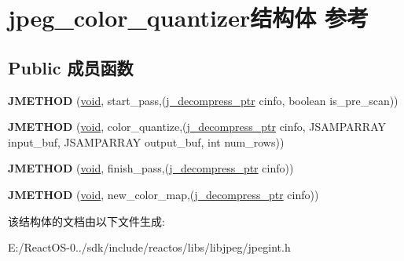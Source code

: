 \hypertarget{structjpeg__color__quantizer}{}\section{jpeg\+\_\+color\+\_\+quantizer结构体 参考}
\label{structjpeg__color__quantizer}
\subsection*{Public 成员函数}
\begin{DoxyCompactItemize}
\item 
\mbox{\label{structjpeg__color__quantizer_a3296d9d04a267c50808154ce6bdcef1b}} 
{\bfseries J\+M\+E\+T\+H\+OD} (\hyperlink{interfacevoid}{void}, start\+\_\+pass,(\hyperlink{structjpeg__decompress__struct}{j\+\_\+decompress\+\_\+ptr} cinfo, boolean is\+\_\+pre\+\_\+scan))
\item 
\mbox{\label{structjpeg__color__quantizer_ac11184c8e0fdc9c0ec200c0fab197b5f}} 
{\bfseries J\+M\+E\+T\+H\+OD} (\hyperlink{interfacevoid}{void}, color\+\_\+quantize,(\hyperlink{structjpeg__decompress__struct}{j\+\_\+decompress\+\_\+ptr} cinfo, J\+S\+A\+M\+P\+A\+R\+R\+AY input\+\_\+buf, J\+S\+A\+M\+P\+A\+R\+R\+AY output\+\_\+buf, int num\+\_\+rows))
\item 
\mbox{\label{structjpeg__color__quantizer_abb5268c27447bc9ae1876c5fffa94081}} 
{\bfseries J\+M\+E\+T\+H\+OD} (\hyperlink{interfacevoid}{void}, finish\+\_\+pass,(\hyperlink{structjpeg__decompress__struct}{j\+\_\+decompress\+\_\+ptr} cinfo))
\item 
\mbox{\label{structjpeg__color__quantizer_a9531395d8c6f914f57bea01ff2b2c5b4}} 
{\bfseries J\+M\+E\+T\+H\+OD} (\hyperlink{interfacevoid}{void}, new\+\_\+color\+\_\+map,(\hyperlink{structjpeg__decompress__struct}{j\+\_\+decompress\+\_\+ptr} cinfo))
\end{DoxyCompactItemize}


该结构体的文档由以下文件生成\+:\begin{DoxyCompactItemize}
\item 
E\+:/\+React\+O\+S-\/0../sdk/include/reactos/libs/libjpeg/jpegint.\+h\end{DoxyCompactItemize}

